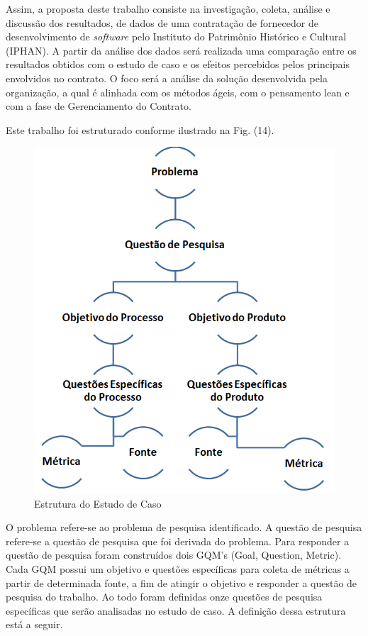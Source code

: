 Assim, a proposta deste trabalho consiste na investigação, coleta, análise e discussão dos resultados, de dados de uma contratação de fornecedor de desenvolvimento de \textit{software} pelo Instituto do Patrimônio Histórico e Cultural (IPHAN). A partir da análise  dos dados será realizada uma comparação entre os resultados obtidos com o estudo de caso e os efeitos percebidos pelos principais envolvidos no contrato. O foco será a análise da solução desenvolvida pela organização, a qual é alinhada com os métodos ágeis, com o pensamento lean e com a fase de Gerenciamento do Contrato.


Este trabalho foi estruturado conforme ilustrado na Fig. (14).

\begin{figure}[H]
		\centering
		\label{fig01}
			\includegraphics[scale=1.0]{figuras/estruturaEstudo.png}
		\caption{Estrutura do Estudo de Caso}
	\end{figure}

O problema refere-se ao problema de pesquisa identificado. A questão de pesquisa refere-se a questão de pesquisa que foi derivada do problema. Para responder a questão de pesquisa foram construídos dois GQM's (Goal, Question, Metric). Cada GQM possui um objetivo e questões específicas para coleta de métricas a partir de determinada fonte, a fim de atingir o objetivo e responder a questão de pesquisa do trabalho. Ao todo foram definidas onze questões de pesquisa específicas que serão analisadas no estudo de caso. A definição dessa estrutura está a seguir.

